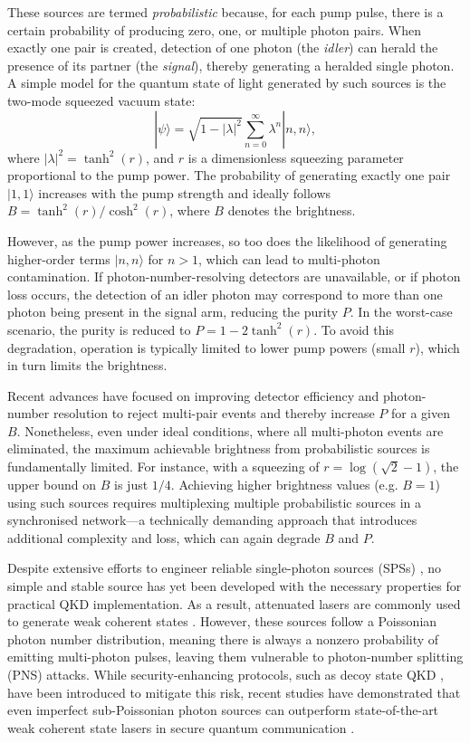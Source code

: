 These sources are termed \textit{probabilistic} because, for each pump pulse, there is a certain probability of producing zero, one, or multiple photon pairs. When exactly one pair is created, detection of one photon (the \textit{idler}) can herald the presence of its partner (the \textit{signal}), thereby generating a heralded single photon. A simple model for the quantum state of light generated by such sources is the two-mode squeezed vacuum state:
\[
|\psi\rangle = \sqrt{1 - |\lambda|^2} \sum_{n=0}^{\infty} \lambda^n |n,n\rangle,
\]
where \( |\lambda|^2 = \tanh^2(r) \), and \( r \) is a dimensionless squeezing parameter proportional to the pump power. The probability of generating exactly one pair \( |1,1\rangle \) increases with the pump strength and ideally follows \( B = \tanh^2(r)/\cosh^2(r) \), where \( B \) denotes the brightness.

However, as the pump power increases, so too does the likelihood of generating higher-order terms \( |n,n\rangle \) for \( n > 1 \), which can lead to multi-photon contamination. If photon-number-resolving detectors are unavailable, or if photon loss occurs, the detection of an idler photon may correspond to more than one photon being present in the signal arm, reducing the purity \( P \). In the worst-case scenario, the purity is reduced to \( P = 1 - 2\tanh^2(r) \). To avoid this degradation, operation is typically limited to lower pump powers (small \( r \)), which in turn limits the brightness.

Recent advances have focused on improving detector efficiency and photon-number resolution to reject multi-pair events and thereby increase \( P \) for a given \( B \). Nonetheless, even under ideal conditions, where all multi-photon events are eliminated, the maximum achievable brightness from probabilistic sources is fundamentally limited. For instance, with a squeezing of \( r = \log(\sqrt{2} - 1) \), the upper bound on \( B \) is just \( 1/4 \). Achieving higher brightness values (e.g. \( B = 1 \)) using such sources requires multiplexing multiple probabilistic sources in a synchronised network—a technically demanding approach that introduces additional complexity and loss, which can again degrade \( B \) and \( P \).


\newpage

Despite extensive efforts to engineer reliable single-photon sources (SPSs) \cite{Eisaman2011}, no simple and stable source has yet been developed with the necessary properties for practical QKD implementation. As a result, attenuated lasers are commonly used to generate weak coherent states \cite{Stucki2005}. However, these sources follow a Poissonian photon number distribution, meaning there is always a nonzero probability of emitting multi-photon pulses, leaving them vulnerable to photon-number splitting (PNS) attacks. While security-enhancing protocols, such as decoy state QKD \cite{Lo2005}, have been introduced to mitigate this risk, recent studies have demonstrated that even imperfect sub-Poissonian photon sources can outperform state-of-the-art weak coherent state lasers in secure quantum communication \cite{Ordan2024}.
